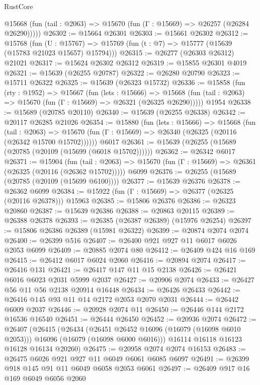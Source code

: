 \begin{lexlean}{RustCore}
\begin{coremodule}
      @15668 (fun (tail : @2063) => @15670 (fun (Γ : @15669) => @26257 (@26284 @26290)))))
@26302 := @15664 @26301
@26303 := @15661 @26302
@26312 := @15768
    (fun (U : @15767) => @15769 (fun (t : @7) => @15777 (@15639 (@15783 @21023 @15657) @15794)))
@26315 := @26277 (@26303 @26312) @21021
@26317 := @15624 @26302 @26312
@26319 := @15855 @26301 @4019
@26321 := @15639 (@26255 @20787)
@26322 := @26280 @20790
@26323 := @15711 @26322
@26325 := @15639 (@26323 @15732)
@26336 := @15858
    (fun (rty : @1952) =>
    @15667
      (fun (lets : @15666) =>
      @15668 (fun (tail : @2063) => @15670 (fun (Γ : @15669) => @26321 (@26325 @26290)))))
    @1954
@26338 := @15689 (@20785 @20110)
@26340 := @15639 (@26255 @26338)
@26342 := @20117 @26285 @21026
@26354 := @15880
    (fun (lets : @15666) =>
    @15668
      (fun (tail : @2063) =>
      @15670 (fun (Γ : @15669) => @26340 (@26325 (@20116 (@26342 @15700 @15702))))))
    @6017
@26361 := @15639 (@26255 (@15689 (@20785 (@20109 (@15699 (@6018 @15702))))))
@26362 := @26342 @6017
@26371 := @15904
    (fun (tail : @2063) => @15670 (fun (Γ : @15669) => @26361 (@26325 (@20116 (@26362 @15702)))))
    @6099
@26376 := @26255 (@15689 (@20785 (@20109 (@15699 @6100))))
@26377 := @15639 @26376
@26378 := @26362 @6099
@26384 := @15922 (fun (Γ : @15669) => @26377 (@26325 (@20116 @26378))) @15963
@26385 := @15806 @26376
@26386 := @26323 @20860
@26387 := @15639 @26386
@26388 := @20863 @20115
@26389 := @26388 @26378
@26393 := @26385 (@26387 @26389) (@15976 @26254)
@26397 := @15806 @26386 @26389 (@15981 @26322)
@26399 := @20874 @2074 @2074
@26400 := @26399 @516
@26407 := @26400 @921 @927 @11 @6017 @6026 @2053 @6099
@26409 := @20885 @2074 @80
@26412 := @26409 @424 @16 @169
@26415 := @26412 @6017 @6024 @2060
@26416 := @20894 @2074
@26417 := @26416 @131
@26421 := @26417 @147 @11 @15 @2138
@26426 := @26421 @6016 @6023 @2031 @5999 @2037
@26427 := @20906 @2074
@26433 := @26427 @56 @11 @56 @2138 @20914 @16448
@26434 := @26426 @26433
@26442 := @26416 @145 @93 @11 @14 @2172 @2053 @2070 @2031
@26444 := @26442 @6009 @2037
@26446 := @20928 @2074 @11
@26450 := @26446 @144 @2172 @16536 @16540
@26451 := @26444 @26450
@26452 := @20936 @2074
@26472 := @26407
    (@26415
      (@26434
        (@26451 @26452 @16096 (@16079 (@16098 @6010 @2053)))
        @16096
        (@16079 (@16098 @6000 @6016)))
      @16114
      @16118
      @16123
      @16128
      @16134
      @20260)
@26475 := @20958 @2074 @2074 @16153
@26483 := @26475 @6026 @921 @927 @11 @6049 @6061 @6085 @6097
@26491 := @26399 @918 @145 @91 @11 @6049 @6058 @2053 @6061
@26497 := @26409 @917 @16 @169 @6049 @6056 @2060

\end{coremodule}
\end{lexlean}
